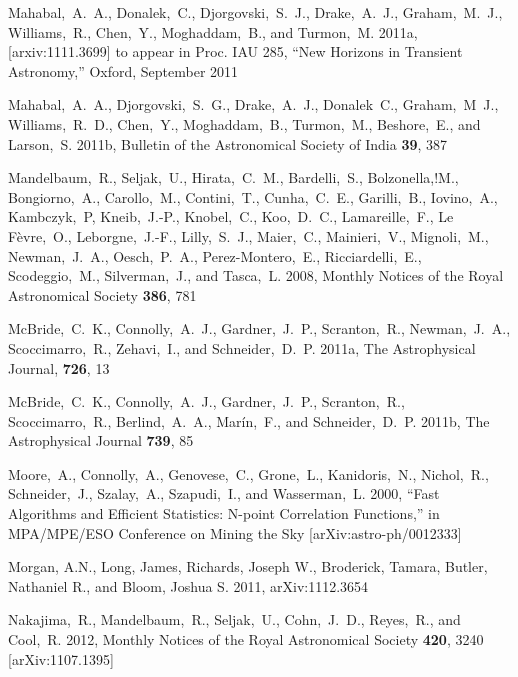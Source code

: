 \documentclass[useAMS,usenatbib,tightenlines,11pt,preprint]{aastex}
\begin{document}
\begin{thebibliography}{99}
Mahabal,~A.~A., Donalek,~C., Djorgovski,~S.~J., Drake,~A.~J.,
Graham,~M.~J., Williams,~R., Chen,~Y., Moghaddam,~B., and Turmon,~M.
2011a, [arxiv:1111.3699] to appear in Proc. IAU 285, ``New Horizons in Transient
Astronomy,'' Oxford, September 2011

Mahabal,~A.~A., Djorgovski,~S.~G., Drake,~A.~J., Donalek~C., Graham,~M~J.,
Williams,~R.~D., Chen,~Y., Moghaddam,~B., Turmon,~M., Beshore,~E., and Larson,~S.
2011b, Bulletin of the Astronomical Society of India {\bf 39}, 387

Mandelbaum,~R., Seljak,~U., Hirata,~C.~M., Bardelli,~S., Bolzonella,!M.,
Bongiorno,~A., Carollo,~M., Contini,~T., Cunha,~C.~E., Garilli,~B.,
Iovino,~A., Kambczyk,~P, Kneib,~J.-P., Knobel,~C., Koo,~D.~C., Lamareille,~F.,
Le F\`evre,~O., Leborgne,~J.-F., Lilly,~S.~J., Maier,~C., Mainieri,~V.,
Mignoli,~M., Newman,~J.~A., Oesch,~P.~A., Perez-Montero,~E., Ricciardelli,~E.,
Scodeggio,~M., Silverman,~J., and Tasca,~L. 2008, Monthly Notices of the Royal
Astronomical Society {\bf 386}, 781

McBride,~C.~K., Connolly,~A.~J., Gardner,~J.~P., Scranton,~R., Newman,~J.~A.,
Scoccimarro,~R., Zehavi,~I., and Schneider,~D.~P. 2011a, The Astrophysical
Journal, {\bf 726}, 13

McBride,~C.~K., Connolly,~A.~J., Gardner,~J.~P., Scranton,~R., Scoccimarro,~R.,
Berlind,~A.~A., Mar\'in,~F., and Schneider,~D.~P. 2011b, The Astrophysical
Journal {\bf 739}, 85

Moore,~A., Connolly,~A., Genovese,~C., Grone,~L., Kanidoris,~N., Nichol,~R.,
Schneider,~J., Szalay,~A., Szapudi,~I., and Wasserman,~L. 2000,
``Fast Algorithms and Efficient Statistics: N-point Correlation Functions,'' in
MPA/MPE/ESO Conference on Mining the Sky [arXiv:astro-ph/0012333]

Morgan, A.N., Long, James, Richards, Joseph W., Broderick, Tamara, Butler,
Nathaniel R., and Bloom, Joshua S. 2011, arXiv:1112.3654

Nakajima,~R., Mandelbaum,~R., Seljak,~U., Cohn,~J.~D., Reyes,~R., and
Cool,~R. 2012, Monthly Notices of the Royal Astronomical Society {\bf 420}, 3240
[arXiv:1107.1395]


\end{thebibliography}
\end{document}

